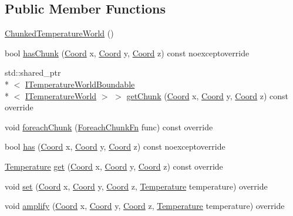 \subsection*{Public Member Functions}
\begin{DoxyCompactItemize}
\item 
\hyperlink{class_chunked_temperature_world_a9c60a8c8964e67556cc51a046f0cb42f}{Chunked\-Temperature\-World} ()
\item 
bool \hyperlink{class_chunked_temperature_world_aa06bb1517a6ba6537a89992a8a2f4d8e}{has\-Chunk} (\hyperlink{struct_coord}{Coord} x, \hyperlink{struct_coord}{Coord} y, \hyperlink{struct_coord}{Coord} z) const noexceptoverride
\item 
std\-::shared\-\_\-ptr\\*
$<$ \hyperlink{class_i_temperature_world_boundable}{I\-Temperature\-World\-Boundable}\\*
$<$ \hyperlink{class_i_temperature_world}{I\-Temperature\-World} $>$ $>$ \hyperlink{class_chunked_temperature_world_a9b925259d18aecbde683048ee0422d72}{get\-Chunk} (\hyperlink{struct_coord}{Coord} x, \hyperlink{struct_coord}{Coord} y, \hyperlink{struct_coord}{Coord} z) const override
\item 
void \hyperlink{class_chunked_temperature_world_ab737084e5879c35044c34012fd2281b3}{foreach\-Chunk} (\hyperlink{class_i_temperature_world_chunkable_mixin_abad666f407110d3370328bf97335c8be}{Foreach\-Chunk\-Fn} func) const override
\item 
bool \hyperlink{class_chunked_temperature_world_a05f4ce24ff44a6f4f17a8aac71f78af0}{has} (\hyperlink{struct_coord}{Coord} x, \hyperlink{struct_coord}{Coord} y, \hyperlink{struct_coord}{Coord} z) const noexceptoverride
\item 
\hyperlink{struct_temperature}{Temperature} \hyperlink{class_chunked_temperature_world_a9b57de410490bd8f5d6bc69d09d6b97c}{get} (\hyperlink{struct_coord}{Coord} x, \hyperlink{struct_coord}{Coord} y, \hyperlink{struct_coord}{Coord} z) const override
\item 
void \hyperlink{class_chunked_temperature_world_a97210f06e70f9ea07a4b284963e610e1}{set} (\hyperlink{struct_coord}{Coord} x, \hyperlink{struct_coord}{Coord} y, \hyperlink{struct_coord}{Coord} z, \hyperlink{struct_temperature}{Temperature} temperature) override
\item 
void \hyperlink{class_chunked_temperature_world_af4d90e4910f2197691f2c08f11cbc657}{amplify} (\hyperlink{struct_coord}{Coord} x, \hyperlink{struct_coord}{Coord} y, \hyperlink{struct_coord}{Coord} z, \hyperlink{struct_temperature}{Temperature} temperature) override

\end{DoxyCompactItemize}
